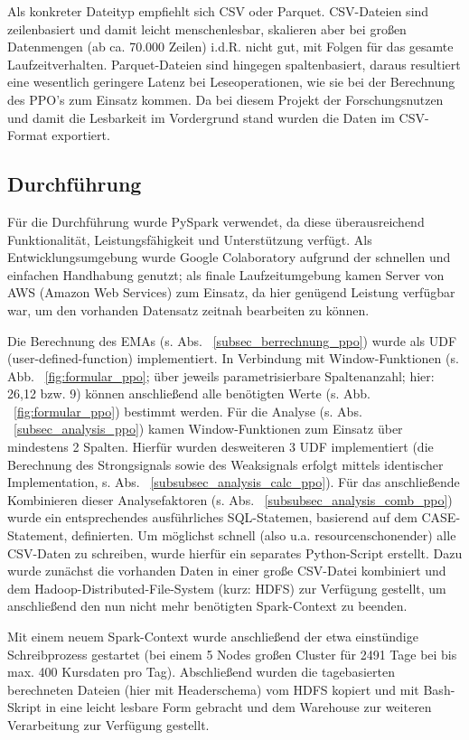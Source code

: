 Als konkreter Dateityp empfiehlt sich CSV oder Parquet. CSV-Dateien sind zeilenbasiert und damit leicht menschenlesbar, skalieren aber bei großen Datenmengen (ab ca. 70.000 Zeilen) i.d.R. nicht gut, mit Folgen für das gesamte Laufzeitverhalten. Parquet-Dateien sind hingegen spaltenbasiert, daraus resultiert eine wesentlich geringere Latenz bei Leseoperationen, wie sie bei der Berechnung des PPO's zum Einsatz kommen. Da bei diesem Projekt der Forschungsnutzen und damit die Lesbarkeit im Vordergrund stand wurden die Daten im CSV-Format exportiert. \cite{medCsvParq,dzCsvParq,wikiCsv,wikiParq}

\subsection{Durchführung}
Für die Durchführung wurde PySpark verwendet, da diese überausreichend Funktionalität, Leistungsfähigkeit und Unterstützung verfügt. Als Entwicklungsumgebung wurde Google Colaboratory aufgrund der schnellen und einfachen Handhabung genutzt; als finale Laufzeitumgebung kamen Server von AWS (Amazon Web Services) zum Einsatz, da hier genügend Leistung verfügbar war, um den vorhanden Datensatz zeitnah bearbeiten zu können.

Die Berechnung des EMAs (s. Abs. ~\ref{subsec_berrechnung_ppo}) wurde als UDF (user-defined-function) implementiert. In Verbindung mit Window-Funk\-tionen (s. Abb. ~\ref{fig:formular_ppo}; über jeweils parametrisierbare Spaltenanzahl; hier: 26,12 bzw. 9) können anschließend alle benötigten Werte (s. Abb. ~\ref{fig:formular_ppo}) bestimmt werden.
Für die Analyse (s. Abs. ~\ref{subsec_analysis_ppo}) kamen Window-Funktionen zum Einsatz über mindestens 2 Spalten. Hierfür wurden desweiteren 3 UDF implementiert (die Berechnung des Strongsignals sowie des Weaksignals erfolgt mittels identischer Implementation, s. Abs. ~\ref{subsubsec_analysis_calc_ppo}). Für das anschließende Kombinieren dieser Analysefaktoren (s. Abs. ~\ref{subsubsec_analysis_comb_ppo}) wurde ein entsprechendes ausführliches SQL-Statemen, basierend auf dem CASE-Statement, definierten.
Um möglichst schnell (also u.a. resourcenschonender) alle CSV-Daten zu schreiben, wurde hierfür ein separates Python-Script erstellt. Dazu wurde zunächst die vorhanden Daten in einer große CSV-Datei kombiniert und dem Hadoop-Distributed-File-System (kurz: HDFS) zur Verfügung gestellt, um anschließend den nun nicht mehr benötigten Spark-Context zu beenden. 

Mit einem neuem Spark-Context wurde anschließend der etwa einstündige Schreibprozess gestartet (bei einem 5 Nodes großen Cluster für 2491 Tage bei bis max. 400 Kursdaten pro Tag). Abschließend wurden die tagebasierten berechneten Dateien (hier mit Headerschema) vom HDFS kopiert und mit Bash-Skript in eine leicht lesbare Form gebracht und dem Warehouse zur weiteren Verarbeitung zur Verfügung gestellt. 


